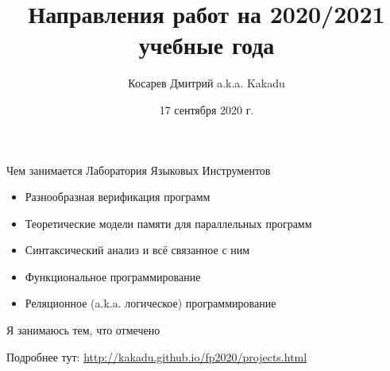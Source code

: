\documentclass[aspectratio=169
  , xcolor={svgnames}
  , hyperref=
      { colorlinks
      , urlcolor=DarkBlue
      }  
  , 12pt
  , russian  %
  ]{beamer}
\title{Направления работ на 2020/2021 учебные года}
\institute[]{Лаборатория Языковых Инструментов JetBrains}
\author[Косарев Дмитрий]{Косарев Дмитрий a.k.a. Kakadu}
\date{17 сентября 2020 г.}
\begin{document}
\maketitle


\everymath{\displaystyle}

\begin{frame}{Чем занимается Лаборатория Языковых Инструментов}
\begin{itemize}
\item Разнообразная верификация программ
\item Теоретические модели памяти для параллельных программ
\item [\faGood] Синтаксический анализ и всё связанное с ним
\item [\faGood] Функциональное программирование
\item [\faGood] Реляционное (a.k.a. логическое) программирование
\end{itemize}
\vspace{3em}

Я занимаюсь тем, что отмечено \faGood

Подробнее тут: \href{http://kakadu.github.io/fp2020/projects.html}{http://kakadu.github.io/fp2020/projects.html}
\end{frame}
\end{document}
